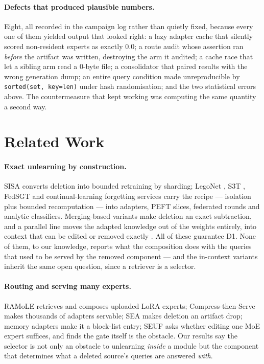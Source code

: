 \documentclass[11pt]{article}
\begin{document}
\paragraph{Defects that produced plausible numbers.} Eight, all recorded in the campaign log rather
than quietly fixed, because every one of them yielded output that looked right: a lazy adapter cache
that silently scored non-resident experts as exactly $0.0$; a route audit whose assertion ran
\emph{before} the artifact was written, destroying the arm it audited; a cache race that let a
sibling arm read a 0-byte file; a consolidator that paired results with the wrong generation dump;
an entire query condition made unreproducible by \texttt{sorted(set, key=len)} under hash
randomisation; and the two statistical errors above. The countermeasure that kept working was
computing the same quantity a second way.

\section{Related Work}
\label{sec:related}

\paragraph{Exact unlearning by construction.} SISA \citep{bourtoule2021sisa} converts deletion into
bounded retraining by sharding; LegoNet \citep{yu2022legonet}, S3T
\citep{basuroychowdhury2025s3t}, FedSGT \citep{zhang2025fedsgt} and continual-learning forgetting
services \citep{huang2025forgetting} carry the recipe --- isolation plus bounded recomputation ---
into adapters, PEFT slices, federated rounds and analytic classifiers. Merging-based variants
\citep{ilharco2023task,yu2024dare,kuo2025sift} make deletion an exact subtraction, and a parallel
line moves the adapted knowledge out of the weights entirely, into context that can be edited
\citep{pawelczyk2024icul} or removed exactly \citep{muresanu2024fastexact}. All of these guarantee
D1. None of them, to our knowledge, reports what the composition does with the queries that used to
be served by the removed component --- and the in-context variants inherit the same open question,
since a retriever is a selector.

\paragraph{Routing and serving many experts.} RAMoLE \citep{zhao2024ramole} retrieves and composes
uploaded LoRA experts; Compress-then-Serve \citep{gabrielsson2025compress} makes thousands of
adapters servable; SEA \citep{schneider2026sea} makes deletion an artifact drop; memory adapters
\citep{grimes2026memadapt} make it a block-list entry; SEUF \citep{zhuang2024seuf} asks whether
editing one MoE expert suffices, and finds the gate itself is the obstacle. Our results say the
selector is not only an obstacle to unlearning \emph{inside} a module but the component that
determines what a deleted source's queries are answered \emph{with}.
\end{document}

